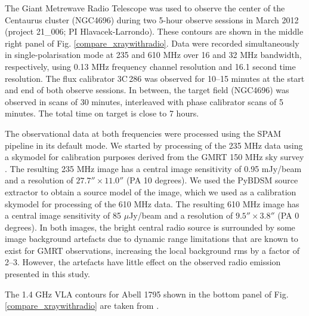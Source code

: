 \documentclass[useAMS,usenatbib]{mn2e}
\begin{document}
The Giant Metrewave Radio Telescope \citep[GMRT;][]{1991ASPC...19..376S} was used to observe the center
 of the Centaurus cluster (NGC4696) during two 5-hour observe sessions in March 2012 (project 21\_006; PI
 Hlavacek-Larrondo). These contours are shown in the middle right panel of Fig. \ref{compare_xraywithradio}. Data were recorded simultaneously in single-polarisation mode at 235 and 610 MHz over
 16 and 32 MHz bandwidth, respectively, using 0.13 MHz frequency channel resolution and 16.1 second time resolution.
 The flux calibrator 3C\,286 was observed for 10--15 minutes at the start and end of both observe sessions.
 In between, the target field (NGC4696) was observed in scans of 30 minutes, interleaved with phase calibrator
 scans of 5 minutes. The total time on target is close to 7 hours.

The observational data at both frequencies were processed using the SPAM pipeline \citep{2014ascl.soft08006I}
 in its default mode. We started by processing of the 235 MHz data using a skymodel for calibration purposes
 derived from the GMRT 150 MHz sky survey \citep[TGSS ADR1;][]{2016arXiv160304368I}. The resulting 235 MHz image
 has a central image sensitivity of 0.95 mJy/beam and a resolution of $27.7'' \times 11.0''$ (PA 10 degrees). 
We used the PyBDSM source extractor \citep{2015ascl.soft02007M} to obtain a source model of the image, which
 we used as a calibration skymodel for processing of the 610 MHz data. The resulting 610 MHz image has a central 
image sensitivity of 85 $\mu$Jy/beam and a resolution of $9.5'' \times 3.8''$ (PA 0 degrees). In both images, 
the bright central radio source is surrounded by some image background artefacts due to dynamic range limitations
 that are known to exist for GMRT observations, increasing the local background rms by a factor of 2--3. However, 
the artefacts have little effect on the observed radio emission presented in this study.

The 1.4 GHz VLA contours for Abell 1795 shown in the bottom panel of Fig. \ref{compare_xraywithradio} are taken from 
\citet{Giacintucci2014}.
\end{document}
